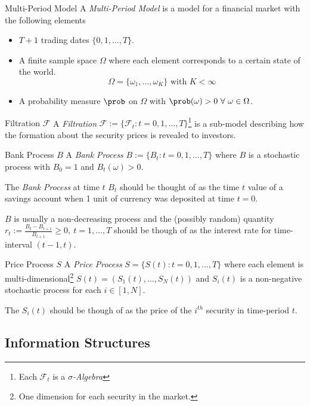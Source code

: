 \documentclass[11pt,a4paper]{article}
\begin{document}
  \begin{definition}{Multi-Period Model}
    A \textit{Multi-Period Model} is a model for a financial market with the following elements
    \begin{itemize}
      \item $T+1$ trading dates $\{0,1,\dots,T\}$.
      \item A finite sample space $\Omega$ where each element corresponds to a certain state of the world.
      \[ \Omega=\{\omega_1,\dots,\omega_K\}\text{ with }K<\infty \]
      \item A probability measure $\prob$ on $\Omega$ with $\prob(\omega)>0\ \forall\ \omega\in\Omega$.
    \end{itemize}
  \end{definition}

  \begin{definition}{Filtration $\mathcal{F}$}
    A \textit{Filtration} $\mathcal{F}:=\{\mathcal{F}_t:t=0,1,\dots,T\}$\footnote{Each $\mathcal{F}_t$ is a \textit{$\sigma$-Algebra}} is a sub-model describing how the formation about the security prices is revealed to investors.
  \end{definition}

  \begin{definition}{Bank Process $B$}
    A \textit{Bank Process} $B:=\{B_t:t=0,1,\dots,T\}$ where $B$ is a stochastic process with $B_0=1$ and $B_t(\omega)>0$.
    \par The \textit{Bank Process} at time $t$ $B_t$ should be thought of as the time $t$ value of a savings account when 1 unit of currency was deposited at time $t=0$.
    \par $B$ is usually a non-decreasing process and the (possibly random) quantity $r_t:=\frac{B_t-B_{t+1}}{B_{t+1}}\geq0,\ t=1,\dots,T$ should be though of as the interest rate for time-interval $(t-1,t)$.
  \end{definition}

  \begin{definition}{Price Process $S$}
    A \textit{Price Process} $S=\{S(t):t=0,1,\dots,T\}$ where each element is multi-dimensional\footnote{One dimension for each security in the market.} $S(t)=(S_1(t),\dots,S_N(t))$ and $S_i(t)$ is a non-negative stochastic process for each $i\in[1,N]$. \par The $S_i(t)$ should be though of as the price of the $i^{th}$ security in time-period $t$.
  \end{definition}

\subsection{Information Structures}
\end{document}
